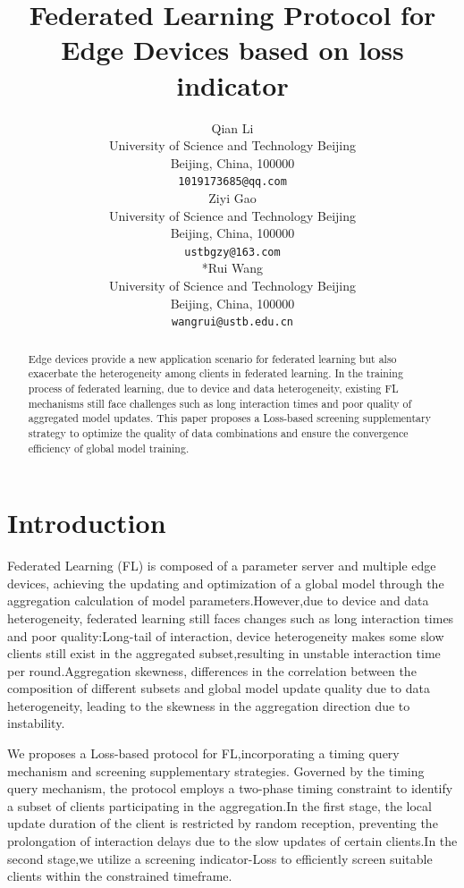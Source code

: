 \documentclass{article}
\title{Federated Learning Protocol for Edge Devices based on loss indicator}
\author{ Qian Li \\
	University of Science and Technology Beijing\\
	Beijing, China, 100000\\
	\texttt{1019173685@qq.com} \\
        \And
	Ziyi Gao \\
	University of Science and Technology Beijing\\
	Beijing, China, 100000\\
	\texttt{ustbgzy@163.com} \\
        \And
        *Rui Wang \\
        University of Science and Technology Beijing\\
        Beijing, China, 100000\\
        \texttt{wangrui@ustb.edu.cn} \\
}
\begin{document}
\maketitle


\begin{abstract}
	Edge devices provide a new application scenario for federated learning but also exacerbate the heterogeneity among clients in federated learning. In the training process of federated learning, due to device and data heterogeneity, existing FL mechanisms still face challenges such as long interaction times and poor quality of aggregated model updates. This paper proposes a Loss-based screening supplementary strategy to optimize the quality of data combinations and ensure the convergence efficiency of global model training.
\end{abstract}



\section{Introduction}
Federated Learning (FL) is composed of a parameter server and multiple edge devices, achieving the updating and optimization of a global model through the aggregation calculation of model parameters.However,due to device and data heterogeneity, federated learning still faces changes such as long interaction times and poor quality:Long-tail of interaction, device heterogeneity makes some slow clients still exist in the aggregated subset,resulting in unstable interaction time per round.Aggregation skewness, differences in the correlation between the composition of different subsets and global model update quality due to data heterogeneity, leading to the skewness in the aggregation direction due to instability.

We proposes a Loss-based protocol for FL,incorporating a timing query mechanism and screening supplementary strategies. Governed by the timing query mechanism, the protocol employs a two-phase timing constraint to identify a subset of clients participating in the aggregation.In the first stage, the local update duration of the client is restricted by random reception, preventing the prolongation of interaction delays due to the slow updates of certain clients.In the second stage,we utilize a screening indicator-Loss to efficiently screen suitable clients within the constrained timeframe.
\end{document}
